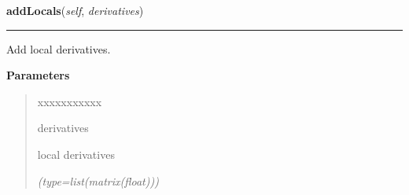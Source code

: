    \label{gblfit:GblPoint:addLocals}

    \vspace{0.5ex}

\hspace{.8\funcindent}\begin{boxedminipage}{\funcwidth}

    \raggedright \textbf{addLocals}(\textit{self}, \textit{derivatives})

    \vspace{-1.5ex}

    \rule{\textwidth}{0.5\fboxrule}
\setlength{\parskip}{2ex}
    Add local derivatives.

\setlength{\parskip}{1ex}
      \textbf{Parameters}
      \vspace{-1ex}

      \begin{quote}
        \begin{Ventry}{xxxxxxxxxxx}

          \item[derivatives]

          local derivatives

            {\it (type=list(matrix(float)))}

        \end{Ventry}

      \end{quote}

    \end{boxedminipage}

    \label{gblfit:GblPoint:addGlobals}

    \vspace{0.5ex}

